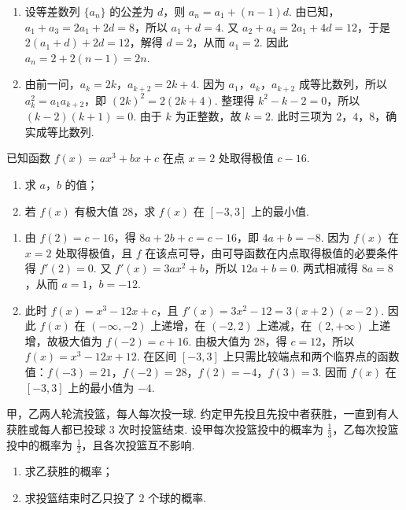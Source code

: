\begin{solution}
\begin{enumerate}
\item 设等差数列 \(\{a_n\}\) 的公差为 \(d\)，则 \(a_n=a_1+(n-1)d\). 由已知，\(a_1+a_3=2a_1+2d=8\)，所以 \(a_1+d=4\). 又 \(a_2+a_4=2a_1+4d=12\)，于是 \(2(a_1+d)+2d=12\)，解得 \(d=2\)，从而 \(a_1=2\). 因此 \(a_n=2+2(n-1)=2n\).
\item 由前一问，\(a_k=2k\)，\(a_{k+2}=2k+4\). 因为 \(a_1\)，\(a_k\)，\(a_{k+2}\) 成等比数列，所以 \(a_k^2=a_1a_{k+2}\)，即 \((2k)^2=2(2k+4)\). 整理得 \(k^2-k-2=0\)，所以 \((k-2)(k+1)=0\). 由于 \(k\) 为正整数，故 \(k=2\). 此时三项为 \(2\)，\(4\)，\(8\)，确实成等比数列.
\end{enumerate}
\end{solution}

\begin{problem}
已知函数 \(f(x)=ax^3+bx+c\) 在点 \(x=2\) 处取得极值 \(c-16\).

\begin{enumerate}
\item 求 \(a\)，\(b\) 的值；
\item 若 \(f(x)\) 有极大值 28，求 \(f(x)\) 在 \([-3,3]\) 上的最小值.
\end{enumerate}
\end{problem}

\begin{solution}
\begin{enumerate}
\item 由 \(f(2)=c-16\)，得 \(8a+2b+c=c-16\)，即 \(4a+b=-8\). 因为 \(f(x)\) 在 \(x=2\) 处取得极值，且 \(f\) 在该点可导，由可导函数在内点取得极值的必要条件得 \(f'(2)=0\). 又 \(f'(x)=3ax^2+b\)，所以 \(12a+b=0\). 两式相减得 \(8a=8\)，从而 \(a=1\)，\(b=-12\).
\item 此时 \(f(x)=x^3-12x+c\)，且 \(f'(x)=3x^2-12=3(x+2)(x-2)\). 因此 \(f(x)\) 在 \((-\infty,-2)\) 上递增，在 \((-2,2)\) 上递减，在 \((2,+\infty)\) 上递增，故极大值为 \(f(-2)=c+16\). 由极大值为 \(28\)，得 \(c=12\)，所以 \(f(x)=x^3-12x+12\). 在区间 \([-3,3]\) 上只需比较端点和两个临界点的函数值：\(f(-3)=21\)，\(f(-2)=28\)，\(f(2)=-4\)，\(f(3)=3\). 因而 \(f(x)\) 在 \([-3,3]\) 上的最小值为 \(-4\).
\end{enumerate}
\end{solution}

\begin{problem}
甲，乙两人轮流投篮，每人每次投一球. 约定甲先投且先投中者获胜，一直到有人获胜或每人都已投球 \(3\) 次时投篮结束. 设甲每次投篮投中的概率为 \(\frac{1}{3}\)，乙每次投篮投中的概率为 \(\frac{1}{2}\)，且各次投篮互不影响.

\begin{enumerate}
\item 求乙获胜的概率；
\item 求投篮结束时乙只投了 \(2\) 个球的概率.
\end{enumerate}
\end{problem}

